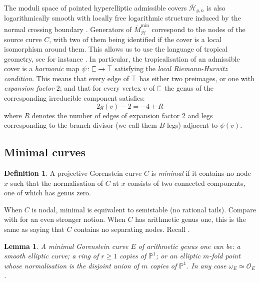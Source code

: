 \documentclass{compositio}
\newcommand{\tropC}{\scalebox{0.8}[1.3]{$\sqsubset$}}
\newcommand{\tropT}{\scalebox{0.9}[1.2]{$\top$}}
\newcommand{\PP}{\mathbb P}
\newcommand{\OO}{\mathcal O}
\renewcommand{\to}{\rightarrow}
\theoremstyle{plain}
\newtheorem{lem}[thm]{Lemma}
\theoremstyle{definition}
\newtheorem{definition}[thm]{Definition}
\theoremstyle{remark}
\begin{document}
 The moduli space of pointed hyperelliptic admissible covers $\overline{\mathcal H}_{g,n}$ is also logarithmically smooth with locally free logarithmic structure induced by the normal crossing boundary \cite{Mochizuki}. Generators of $\overline M_{\bar{\mathcal H}}^\text{min}$ correspond to the nodes of the source curve $C$, with two of them being identified if the cover is a local isomorphism around them. This allows us to use the language of tropical geometry, see for instance \cite{CMR}. In particular, the tropicalisation of an admissible cover is a \emph{harmonic} map $\psi\colon \tropC\to\tropT$ satisfying the \emph{local Riemann-Hurwitz condition}. This means that every edge of $\tropT$ has either two preimages, or one with \emph{expansion factor} $2$; and that for every vertex $v$ of $\tropC$ the genus of the corresponding irreducible component satisfies: \[2g(v)-2=-4+R\]
 where $R$ denotes the number of edges of expansion factor $2$ and legs corresponding to the branch divisor (we call them $B$-legs) adjacent to $\psi(v)$.
 
 \subsection{Minimal curves}
 \begin{definition}
  A projective Gorenstein curve $C$ is \emph{minimal} if it contains no node $x$ such that the normalisation of $C$ at $x$ consists of two connected components, one of which has genus zero.
 \end{definition}

 When $C$ is nodal, minimal is equivalent to semistable (no rational tails). Compare with \cite[Definition 3.2]{Catanese} for an even stronger notion. When $C$ has arithmetic genus one, this is the same as saying that $C$ contains no separating nodes. Recall \cite[Lemma 3.3]{SMY1}.

\begin{lem}\label{lem:min1}
 A minimal Gorenstein curve $E$ of arithmetic genus one can be: a smooth elliptic curve; a ring of $r\geq 1$ copies of $\PP^1$; or an elliptic $m$-fold point whose normalisation is the disjoint union of $m$ copies of $\PP^1$. In any case $\omega_E\simeq\OO_E$.
\end{lem}
\end{document}
